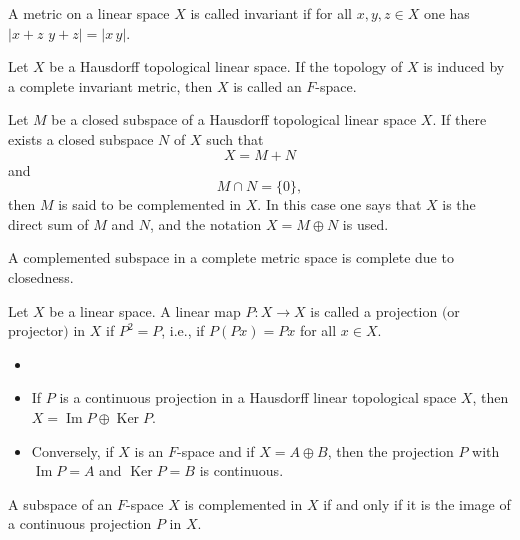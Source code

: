 \documentclass{svproc}
\def\Im{\operatorname{Im}}
\def\Ker{\operatorname{Ker}}
\begin{document}
\begin{definition}
A metric on a linear space $X$ is called invariant if for all $x, y, z\in X$ one has $|x+z\,\, y+z| = |x\, y|$.
\end{definition}

\begin{definition}
Let $X$ be a Hausdorff topological linear space. If the topology of $X$ is induced by a complete invariant metric, then $X$ is called an $F$-space.
\end{definition}

\begin{definition}\label{dfn:comp}
Let $M$ be a closed subspace of a Hausdorff topological linear space $X$. If there exists a closed subspace $N$ of $X$ such that
$$X = M + N$$
and
$$M\cap N = \{0\},$$
then $M$ is said to be complemented in $X$. In this case one says that $X$ is the direct sum of $M$ and $N$, and the notation $X = M \oplus N$ is used.
\end{definition}

\begin{remark}
A complemented subspace in a complete metric space is complete due to closedness.
\end{remark}

\begin{definition}
Let $X$ be a linear space. A linear map $P\colon X\rightarrow X$ is called a projection $($or projector$)$ in $X$ if $P^2 = P$, i.e., if $P(Px)= Px$ for all $x\in X$.
\end{definition}

\begin{theorem}\label{thm:rud}
\begin{itemize}
\item[ ]
\item[$($a$)$] If $P$ is a continuous projection in a Hausdorff linear topological space $X$, then $X = \Im P \oplus \Ker P.$
\item[$($b$)$] Conversely, if $X$ is an $F$-space and if $X = A \oplus B$, then the projection $P$ with $\Im P = A$ and $\Ker P = B$ is continuous.
\end{itemize}
\end{theorem}

\begin{corollary}\label{cor:rud}
A subspace of an $F$-space $X$ is complemented in $X$ if and only if it is the image of a continuous projection $P$ in $X$.
\end{corollary}
\end{document}
